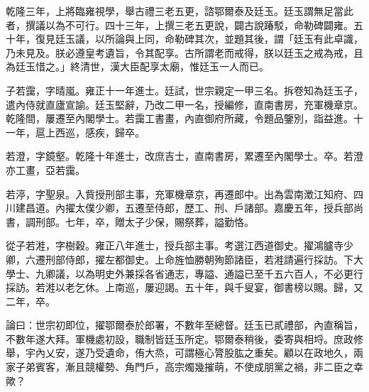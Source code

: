 \begin{pinyinscope}
乾隆三年，上將臨雍視學，舉古禮三老五更，諮鄂爾泰及廷玉。廷玉謂無足當此者，撰議以為不可行。四十三年，上撰三老五更說，闢古說踳駁，命勒碑闢雍。五十年，復見廷玉議，以所論與上同，命勒碑其次，並題其後，謂「廷玉有此卓識，乃未見及。朕必遵皇考遺旨，令其配享。古所謂老而戒得，朕以廷玉之戒為戒，且為廷玉惜之。」終清世，漢大臣配享太廟，惟廷玉一人而已。

子若靄，字晴嵐。雍正十一年進士。廷試，世宗親定一甲三名。拆卷知為廷玉子，遣內侍就直廬宣諭。廷玉堅辭，乃改二甲一名，授編修，直南書房，充軍機章京。乾隆間，屢遷至內閣學士。若靄工書畫，內直御府所藏，令題品鑒別，詣益進。十一年，扈上西巡，感疾，歸卒。

若澄，字鏡壑。乾隆十年進士，改庶吉士，直南書房，累遷至內閣學士。卒。若澄亦工畫，亞若靄。

若渟，字聖泉。入貲授刑部主事，充軍機章京，再遷郎中。出為雲南澂江知府、四川建昌道。內擢太僕少卿，五遷至侍郎，歷工、刑、戶諸部。嘉慶五年，授兵部尚書，調刑部。七年，卒，贈太子少保，賜祭葬，謚勤恪。

從子若溎，字樹穀。雍正八年進士，授兵部主事。考選江西道御史。擢鴻臚寺少卿，六遷刑部侍郎，擢左都御史。上命旌恤勝朝殉節諸臣，若溎請遍行採訪。下大學士、九卿議，以為明史外兼採各省通志，專謚、通謚已至千五六百人，不必更行採訪。若溎以老乞休。上南巡，屢迎謁。五十年，與千叟宴，御書榜以賜。歸，又二年，卒。

論曰：世宗初即位，擢鄂爾泰於郎署，不數年至總督。廷玉已貳禮部，內直稱旨，不數年遂大拜。軍機處初設，職制皆廷玉所定。鄂爾泰稍後，委寄與相埒。庶政修舉，宇內乂安，遂乃受遺命，侑大烝，可謂極心膂股肱之重矣。顧以在政地久，兩家子弟賓客，漸且競權勢、角門戶，高宗燭幾摧萌，不使成朋黨之禍，非二臣之幸歟？


\end{pinyinscope}